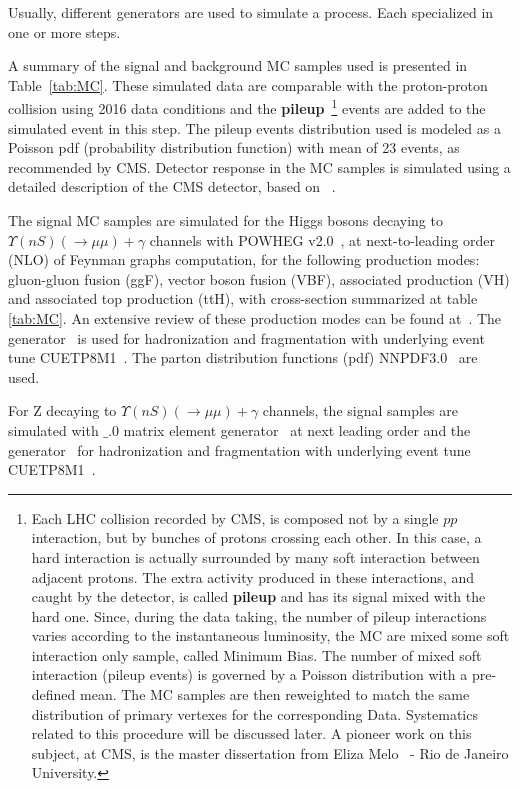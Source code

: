 Usually, different generators are used to simulate a process. Each specialized in one or more steps.

A summary of the signal and background MC samples used is presented in Table~\ref{tab:MC}. These simulated data are comparable with the proton-proton collision using 2016 data conditions and the \textbf{pileup}~\footnote{Each LHC collision recorded by CMS, is composed not by a single $pp$ interaction, but by bunches of protons crossing each other. In this case, a hard interaction is actually surrounded by many soft interaction between adjacent protons. The extra activity produced in these interactions, and caught by the detector, is called \textbf{pileup} and has its signal mixed with the hard one. Since, during the data taking, the number of pileup interactions varies according to the instantaneous luminosity, the MC are mixed some soft interaction only sample, called Minimum Bias. The number of mixed soft interaction (pileup events) is governed by a Poisson distribution with a pre-defined mean. The MC samples are then reweighted to match the same distribution of primary vertexes for the corresponding Data. Systematics related to this procedure will be discussed later. A pioneer work on this subject, at CMS, is the master dissertation from Eliza Melo~\cite{tese_eliza} - Rio de Janeiro University.} events are added to the simulated event in this step. The pileup events distribution used is modeled as a Poisson pdf (probability distribution function) with mean of 23 events, as recommended by CMS. Detector response in the MC samples is simulated using a detailed description of the CMS detector, based on \GEANTfour~\cite{Agostinelli:2002hh}.

The signal MC samples are simulated for the Higgs bosons decaying to $\Upsilon(nS) (\rightarrow \mu\mu) + \gamma$  channels with POWHEG v2.0~\cite{powheg2_1,powheg2_2,powheg2_3}, at next-to-leading order (NLO) of Feynman graphs computation, for the following production modes: gluon-gluon fusion (ggF), vector boson fusion (VBF), associated production (VH) and associated top production (ttH), with cross-section summarized at table \ref{tab:MC}. An extensive review of these production modes can be found at~\cite{DJOUADI20081}. The  generator~\cite{SJOSTRAND2008852,Sjostrand:2014zea} is used for hadronization and fragmentation with underlying event tune CUETP8M1~\cite{Khachatryan:2015pea}. The parton distribution functions (pdf) NNPDF3.0~\cite{NNPDF3} are used. 

 For Z decaying to $\Upsilon(nS) (\rightarrow \mu\mu) + \gamma$  channels, the signal samples are simulated with  $\_$.0 matrix element generator~\cite{Alwall2014} at next leading order and the  generator~\cite{SJOSTRAND2008852,Sjostrand:2014zea} for hadronization and fragmentation with underlying event tune CUETP8M1~\cite{Khachatryan:2015pea}.

